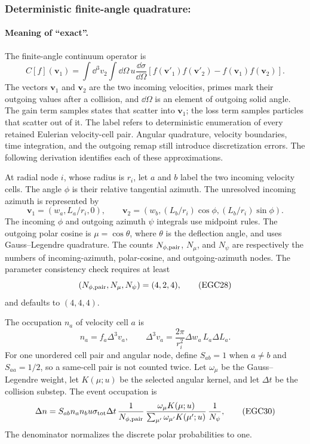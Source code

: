 \subsubsection[Deterministic finite-angle quadrature]{
Deterministic finite-angle quadrature:
}

\paragraph{Meaning of ``exact''.}
The finite-angle continuum operator is
\[
 C[f](\boldsymbol v_1)=
 \int\dd^3v_2\int\dd\Omega\,
 u\frac{\dd\sigma}{\dd\Omega}
 \left[f(\boldsymbol v'_1)f(\boldsymbol v'_2)
       -f(\boldsymbol v_1)f(\boldsymbol v_2)\right].      \tag{EGC26}
\]
The vectors \(\boldsymbol v_1\) and \(\boldsymbol v_2\) are the two incoming
velocities, primes mark their outgoing values after a collision, and
\(\dd\Omega\) is an element of outgoing solid angle.  The gain term samples
states that scatter into \(\boldsymbol v_1\); the loss term samples particles
that scatter out of it.
The label  refers to deterministic enumeration of every
retained Eulerian velocity-cell pair.  Angular quadrature, velocity boundaries,
time integration, and the outgoing remap still introduce discretization
errors.  The following derivation identifies each of these approximations.

At radial node \(i\), whose radius is \(r_i\), let \(a\) and \(b\) label the
two incoming velocity cells.  The angle \(\phi\) is their relative tangential
azimuth.  The unresolved incoming azimuth is represented by
\[
 \boldsymbol v_1=(w_a,L_a/r_i,0),\qquad
 \boldsymbol v_2=(w_b,(L_b/r_i)\cos\phi,
                  (L_b/r_i)\sin\phi).                    \tag{EGC27}
\]
The incoming \(\phi\) and outgoing azimuth \(\psi\) integrals use midpoint
rules.  The outgoing polar cosine is \(\mu=\cos\theta\), where \(\theta\) is
the deflection angle, and uses Gauss--Legendre quadrature.  The counts
\(N_{\phi,\rm pair}\), \(N_\mu\), and \(N_\psi\) are respectively the numbers
of incoming-azimuth, polar-cosine, and outgoing-azimuth nodes.  The parameter
consistency check requires at least
\[
 (N_{\phi,\rm pair},N_\mu,N_\psi)=(4,2,4),               \tag{EGC28}
\]
and defaults to \((4,4,4)\).

The occupation \(n_a\) of velocity cell \(a\) is
\[
 n_a=f_a\Delta^3v_a,\qquad
 \Delta^3v_a=\frac{2\pi}{r_i^2}\Delta w_a\,L_a\Delta L_a.
                                                               \tag{EGC29}
\]
For one unordered cell pair and angular node, define \(S_{ab}=1\) when
\(a\ne b\) and \(S_{aa}=1/2\), so a same-cell pair is not counted twice.
Let \(\omega_\mu\) be the Gauss--Legendre weight, let \(K(\mu;u)\) be the
selected angular kernel, and let \(\Delta t\) be the collision substep.  The
event occupation is
\[
 \Delta n=
 S_{ab}n_an_bu\sigma_{\rm tot}\Delta t\,
 \frac{1}{N_{\phi,\rm pair}}\,
 \frac{\omega_\mu K(\mu;u)}
      {\sum_{\mu'}\omega_{\mu'}K(\mu';u)}\,
 \frac{1}{N_\psi},                                      \tag{EGC30}
\]
The denominator normalizes the discrete polar probabilities to one.

